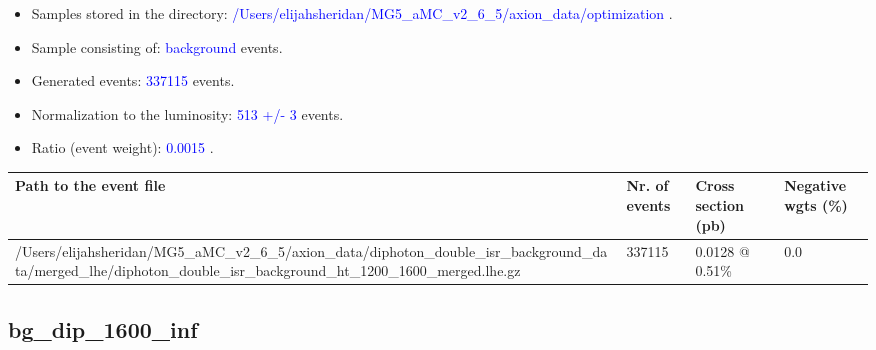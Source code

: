 \documentclass[a4paper, 10pt]{article}
\begin{document}
\begin{itemize}
  \item Samples stored in the directory: \textcolor{blue}{/\-Users/\-elijahsheridan/\-MG5\_aMC\_v2\_6\_5/\-axion\_data/\-optimization} .
   \item Sample consisting of: \textcolor{blue}{background}  events.
   \item Generated events: \textcolor{blue}{337115 }  events.
   \item Normalization to the luminosity: \textcolor{blue}{513}\textcolor{blue}{ +/\-- }\textcolor{blue}{3 }  events.
   \item Ratio (event weight): \textcolor{blue}{0.0015 } .  
 
\end{itemize}
\begin{table}[H]
  \begin{center}
    \begin{tabular}{|m{55.0mm}|m{25.0mm}|m{30.0mm}|m{30.0mm}|}
      \hline
      {\cellcolor{yellow}         Path to the event file}& {\cellcolor{yellow}         Nr. of events}& {\cellcolor{yellow}         Cross section (pb)}& {\cellcolor{yellow}         Negative wgts (\%)}\\
      \hline
      {\cellcolor{white}          /\-Users/\-elijahsheridan/\-MG5\_aMC\_v2\_6\_5/\-axion\_data/\-diphoton\_double\_isr\_background\_data/\-merged\_lhe/\-diphoton\_double\_isr\_background\_ht\_1200\_1600\_merged.lhe.gz}& {\cellcolor{white}          337115}& {\cellcolor{white}          0.0128 @ 0.51\%}& {\cellcolor{white}          0.0}\\
\hline
    \end{tabular}
  \end{center}
\end{table}

\subsection{ bg\_dip\_1600\_inf}
\end{document}
